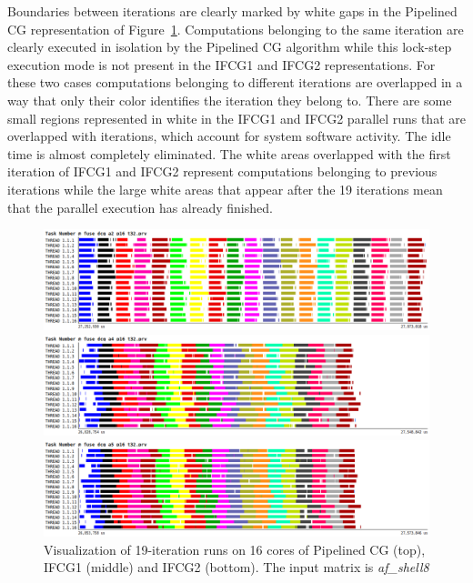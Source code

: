 Boundaries between iterations are clearly marked by white gaps in the Pipelined CG representation of Figure~\ref{paraver}.
Computations belonging to the same iteration are clearly executed in isolation by the Pipelined CG algorithm
while this lock-step execution mode is not present in the IFCG1 and IFCG2 representations.
For these two cases computations belonging to different iterations are overlapped in a way that only their color identifies the iteration they belong to.
There are some small regions represented in white in the IFCG1 and IFCG2 parallel runs that are overlapped with iterations, which account for system software activity. The idle time is almost completely eliminated.
The white areas overlapped with the first iteration of IFCG1 and IFCG2 represent computations belonging to previous iterations while the large white areas that appear after the 19 iterations mean that the parallel execution has already finished.

\begin{figure}[!bhtp]
        \centerline{\includegraphics[scale=0.40]{ifcg/figs/traces/alg2.png}}
        \centerline{\includegraphics[scale=0.40]{ifcg/figs/traces/alg4.png}}
        \centerline{\includegraphics[scale=0.40]{ifcg/figs/traces/alg5.png}}
        \caption{Visualization of 19-iteration runs on 16 cores of Pipelined CG (top), IFCG1 (middle) and IFCG2 (bottom). The input matrix is \textit{af\_shell8}}
        \label{paraver}
\end{figure}

